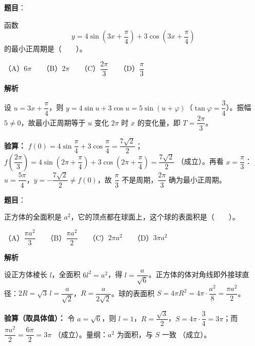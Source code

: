 \begin{answer}

\textbf{题目}：

函数
\nopagebreak[4]
\[
y=4\sin\left(3x+\frac\pi4\right)+3\cos\left(3x+\frac\pi4\right)
\]
的最小正周期是\mbox{（　　）}。

（A）$6\pi$　　（B）$2\pi$　　（C）$\dfrac{2\pi}{3}$　　（D）$\dfrac\pi3$

\textbf{解析}

设 $u=3x+\dfrac{\pi}{4}$，则 $y=4\sin u+3\cos u=5\sin(u+\varphi)$（$\tan\varphi=\dfrac34$）。振幅 $5\ne0$，故最小正周期等于 $u$ 变化 $2\pi$ 时 $x$ 的变化量，即 $T=\dfrac{2\pi}{3}$。

\textbf{验算：} $f(0)=4\sin\dfrac{\pi}{4}+3\cos\dfrac{\pi}{4}=\dfrac{7\sqrt2}{2}$；$f\!\left(\dfrac{2\pi}{3}\right)=4\sin\left(2\pi+\dfrac{\pi}{4}\right)+3\cos\left(2\pi+\dfrac{\pi}{4}\right)=\dfrac{7\sqrt2}{2}$ （成立）。再看 $x=\dfrac{\pi}{3}$：$u=\dfrac{5\pi}{4}$，$y=-\dfrac{7\sqrt2}{2}\ne f(0)$，故 $\dfrac{\pi}{3}$ 不是周期，$\dfrac{2\pi}{3}$ 确为最小正周期。


\par\medskip

\end{answer}
\begin{answer}

\textbf{题目}：

正方体的全面积是 $a^2$，它的顶点都在球面上，这个球的表面积是\mbox{（　　）}。

（A）$\dfrac{\pi a^2}{3}$　　（B）$\dfrac{\pi a^2}{2}$　　（C）$2\pi a^2$　　（D）$3\pi a^2$

\textbf{解析}

设正方体棱长 $l$，全面积 $6l^2=a^2$，得 $l=\dfrac{a}{\sqrt6}$。正方体的体对角线即外接球直径：$2R=\sqrt3\,l=\dfrac{a}{\sqrt2}$，$R=\dfrac{a}{2\sqrt2}$。球的表面积 $S=4\pi R^2=4\pi\cdot\dfrac{a^2}{8}=\dfrac{\pi a^2}{2}$。

\textbf{验算（取具体值）：} 令 $a=\sqrt6$，则 $l=1$，$R=\dfrac{\sqrt3}{2}$，$S=4\pi\cdot\dfrac34=3\pi$；而 $\dfrac{\pi a^2}{2}=\dfrac{6\pi}{2}=3\pi$ （成立）。量纲：$a^2$ 为面积，与 $S$ 一致 （成立）。


\par\medskip

\end{answer}
